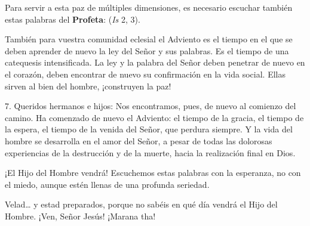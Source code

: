 \begin{body}
	Para servir a esta paz de múltiples dimensiones, es necesario escuchar también estas palabras del \textbf{Profeta}:  (\emph{Is} 2, 3). 
	
	También para vuestra comunidad eclesial el Adviento es el tiempo en el que se deben aprender de nuevo la ley del Señor y sus palabras. Es el tiempo de una catequesis intensificada. La ley y la palabra del Señor deben penetrar de nuevo en el corazón, deben encontrar de nuevo su confirmación en la vida social. Ellas sirven al bien del hombre, ¡construyen la paz! 
	
	7. Queridos hermanos e hijos: Nos encontramos, pues, de nuevo al comienzo del camino. Ha comenzado de nuevo el Adviento: el tiempo de la gracia, el tiempo de la espera, el tiempo de la venida del Señor, que perdura siempre. Y la vida del hombre se desarrolla en el amor del Señor, a pesar de todas las dolorosas experiencias de la destrucción y de la muerte, hacia la realización final en Dios. 
	
	¡El Hijo del Hombre vendrá! Escuchemos estas palabras con la esperanza, no con el miedo, aunque estén llenas de una profunda seriedad. 
	
	Velad\ldots{} y estad preparados, porque no sabéis en qué día vendrá el Hijo del Hombre. ¡Ven, Señor Jesús! ¡Marana tha!
\end{body}